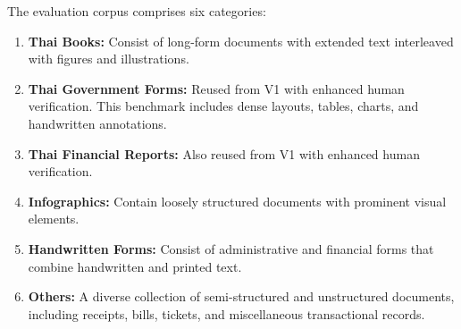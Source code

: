 \documentclass[]{typhoon} %
\begin{document}
The evaluation corpus comprises six categories:
\begin{enumerate}
    \item \textbf{Thai Books:} Consist of long-form documents with extended text interleaved with figures and illustrations.
    \item \textbf{Thai Government Forms:} Reused from V1 with enhanced human verification. This benchmark includes dense layouts, tables, charts, and handwritten annotations.
    \item \textbf{Thai Financial Reports:} Also reused from V1 with enhanced human verification.
    \item \textbf{Infographics:} Contain loosely structured documents with prominent visual elements.
    \item \textbf{Handwritten Forms:} Consist of administrative and financial forms that combine handwritten and printed text.
    \item \textbf{Others:} A diverse collection of semi-structured and unstructured documents, including receipts, bills, tickets, and miscellaneous transactional records.
\end{enumerate}
\end{document}

